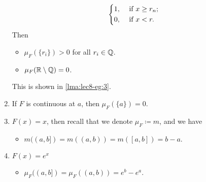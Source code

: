 \begin{eg}
\begin{enumerate}
\[\begin{dcases}
				      1, & \text{ if } x\geq r_n; \\
				      0, & \text{ if } x<r.       \\
			      \end{dcases}
		      \]
		      Then
		      \begin{itemize}
			      \item \(\mu _F(\{r_{i}\})>0\) for all \(r_{i}\in\mathbb{\MakeUppercase{q}} \).
			      \item \(\mu _F(\mathbb{\MakeUppercase{r}} \setminus \mathbb{\MakeUppercase{q}} ) = 0\).
		      \end{itemize}
		      This is shown in \autoref{lma:lec8-eg:3}.
		\item If \(F\) is continuous at \(a\), then \(\mu _F(\{a\}) = 0\).
		\item \(F(x) = x\), then recall that we denote \(\mu _F \coloneqq m\), and we have
		      \begin{itemize}
			      \item \( m((a, b]) = m((a, b)) = m([a, b]) = b - a\).
		      \end{itemize}
		\item \(F(x) = e^x\)
		      \begin{itemize}
			      \item \(\mu _F((a, b]) = \mu _F((a, b)) = e^b - e^a\).
		      \end{itemize}
	\end{enumerate}
\end{eg}

